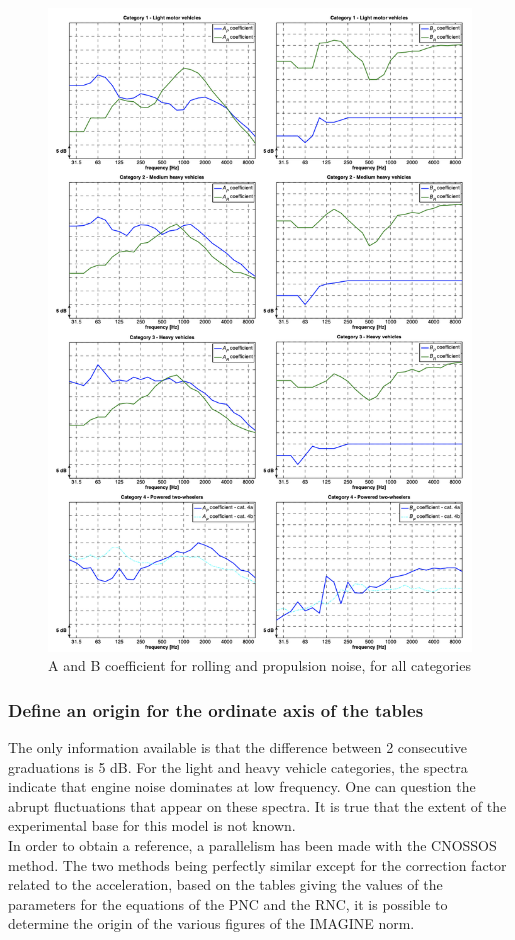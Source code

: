 \documentclass{article}
\begin{document}
\begin{figure}[H]
\caption{A and B coefficient for rolling and propulsion noise, for all categories}
\label{A and B coefficient}
\centering
\includegraphics[scale=0.92]{IMAGINE/A and B coefficient for rolling and propulsion noise, for all categories.png}
\end{figure}

\subsubsection{Define an origin for the ordinate axis of the tables}

 The only information available is that the difference between 2 consecutive graduations is 5 dB. For the light and heavy vehicle categories, the spectra indicate that engine noise dominates at low frequency. One can question the abrupt fluctuations that appear on these spectra. It is true that the extent of the experimental base for this model is not known. \\
{\color{red} In order to obtain a reference, a parallelism has been made with the CNOSSOS method. The two methods being perfectly similar except for the correction factor related to the acceleration, based on the tables giving the values of the parameters for the equations of the PNC and the RNC, it is possible to determine the origin of the various figures of the IMAGINE norm.}
\end{document}
